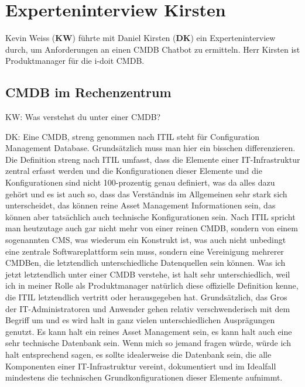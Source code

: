 \chapter{Experteninterview Kirsten}\label{Interview_Kirsten}

Kevin Weiss (\textbf{KW}) führte mit Daniel Kirsten (\textbf{DK}) ein Experteninterview  durch, um Anforderungen an einen CMDB Chatbot zu ermitteln. Herr Kirsten ist Produktmanager für die i-doit CMDB.

\section*{CMDB im Rechenzentrum}

\begin{list}{X:}{\setlength{\labelsep}{5mm}}
\item[KW:] Was verstehst du unter einer CMDB?
\item[DK:] Eine CMDB, streng genommen nach ITIL steht für Configuration Management Database. Grundsätzlich muss man hier ein bisschen differenzieren. Die Definition streng nach ITIL umfasst, dass die Elemente einer IT-Infrastruktur zentral erfasst werden und die Konfigurationen dieser Elemente und die Konfigurationen sind nicht 100-prozentig genau definiert, was da alles dazu gehört und es ist auch so, dass das Verständnis im Allgemeinen sehr stark sich unterscheidet, das können reine Asset Management Informationen sein, das können aber tatsächlich auch technische Konfigurationen sein. Nach ITIL spricht man heutzutage auch gar nicht mehr von einer reinen CMDB, sondern von einem sogenannten CMS, was wiederum ein Konstrukt ist, was auch nicht unbedingt eine zentrale Softwareplattform sein muss, sondern eine Vereinigung mehrerer CMDBen, die letztendlich unterschiedliche Datenquellen sein können. Was ich jetzt letztendlich unter einer CMDB verstehe, ist halt sehr unterschiedlich, weil ich in meiner Rolle als Produktmanager natürlich diese offizielle Definition kenne, die ITIL letztendlich vertritt oder herausgegeben hat. Grundsätzlich, das Gros der IT-Administratoren und Anwender gehen relativ verschwenderisch mit dem Begriff um und es wird halt in ganz vielen unterschiedlichen Ausprägungen genutzt. Es kann halt ein reines Asset Management sein, es kann halt auch eine sehr technische Datenbank sein. Wenn mich so jemand fragen würde, würde ich halt entsprechend sagen, es sollte idealerweise die Datenbank sein, die alle Komponenten einer IT-Infrastruktur vereint, dokumentiert und im Idealfall mindestens die technischen Grundkonfigurationen dieser Elemente aufnimmt.

\end{list}
